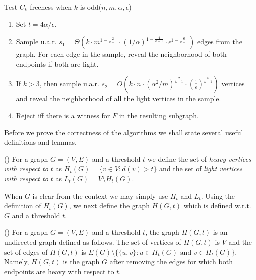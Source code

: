 \textsf{Test-$C_k$-freeness when $k$ is odd}($n, m, \alpha, \epsilon$)
\begin{enumerate}
\item Set $t = 4\alpha/\epsilon$.
\item Sample u.a.r. $s_1 = \Theta \left(k \cdot m^{1-\frac{2}{k-1}} \cdot (1/\alpha)^{1-\frac{4}{k-1}} \cdot \epsilon^{1-\frac{6}{k-1}}\right)$ edges from the graph. For each edge in the sample,  reveal the neighborhood of both endpoints if both are light. 
\item If $k > 3$, then sample u.a.r. $s_2 = O\left(k \cdot n \cdot (\alpha^2/m)^{\frac{2}{k-1}} \cdot \left( \frac{1}{\epsilon}\right)^{\frac{6}{k-1}} \right)$ vertices and reveal the neighborhood of all the light vertices in the sample. 
\item Reject iff there is a witness for $F$ in the resulting subgraph.
\end{enumerate}

Before we prove the correctness of the algorithms we shall state several useful definitions and lemmas. 


\begin{definition}(\cite{})
For a graph $G = (V, E)$ and a threshold $t$ we define the set of {\em heavy vertices with respect to $t$} as $H_t(G) = \{v\in V: d(v) > t\}$ 
and the set of {\em light vertices with respect to $t$} as $L_t(G) = V \setminus H_t(G)$.
\end{definition}
When $G$ is clear from the context we may simply use $H_t$ and $L_t$. 
Using the definition of $H_t(G)$, we next define the graph $H(G, t)$ which is defined w.r.t. $G$ and a threshold $t$.

\begin{definition}(\cite{})
For a graph $G = (V, E)$ and a threshold $t$, the graph $H(G, t)$ is an undirected graph defined as follows.
The set of vertices of $H(G, t)$ is $V$ and the set of edges of $H(G, t)$ is $E(G)\setminus \{\{u, v\} : u\in H_t(G) \text{ and } v \in H_t(G)\}$.
Namely, $H(G, t)$ is the graph $G$ after removing the edges for which both endpoints are heavy with respect to $t$. 
\end{definition}

